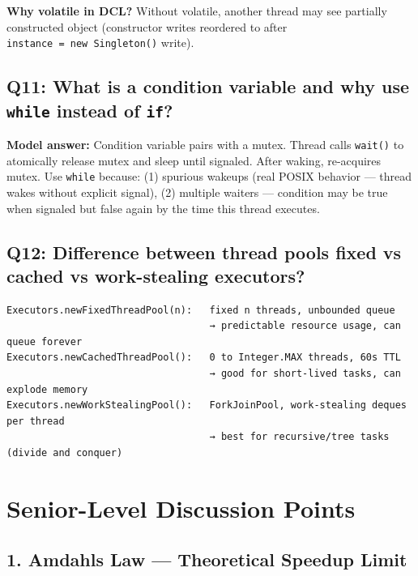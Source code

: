 \documentclass[11pt]{article}
\begin{document}
\textbf{Why volatile in DCL?} Without volatile, another thread may see partially constructed object (constructor writes reordered to after \texttt{instance\ =\ new\ Singleton()} write).

\subsection{\texorpdfstring{Q11: What is a condition variable and why use \texttt{while} instead of \texttt{if}?}{Q11: What is a condition variable and why use while instead of if?}}\label{q11-what-is-a-condition-variable-and-why-use-while-instead-of-if}

\textbf{Model answer:} Condition variable pairs with a mutex. Thread calls \texttt{wait()} to atomically release mutex and sleep until signaled. After waking, re-acquires mutex. Use \texttt{while} because: (1) spurious wakeups (real POSIX behavior --- thread wakes without explicit signal), (2) multiple waiters --- condition may be true when signaled but false again by the time this thread executes.

\subsection{Q12: Difference between thread pool\textquotesingle s fixed vs cached vs work-stealing executors?}\label{q12-difference-between-thread-pools-fixed-vs-cached-vs-work-stealing-executors}

\setcodelang{}

\begin{verbatim}
Executors.newFixedThreadPool(n):   fixed n threads, unbounded queue
                                   → predictable resource usage, can queue forever
Executors.newCachedThreadPool():   0 to Integer.MAX threads, 60s TTL
                                   → good for short-lived tasks, can explode memory
Executors.newWorkStealingPool():   ForkJoinPool, work-stealing deques per thread
                                   → best for recursive/tree tasks (divide and conquer)
\end{verbatim}

\section{Senior-Level Discussion Points}\label{senior-level-discussion-points}

\subsection{1. Amdahl\textquotesingle s Law --- Theoretical Speedup Limit}\label{1-amdahls-law--theoretical-speedup-limit}
\end{document}
